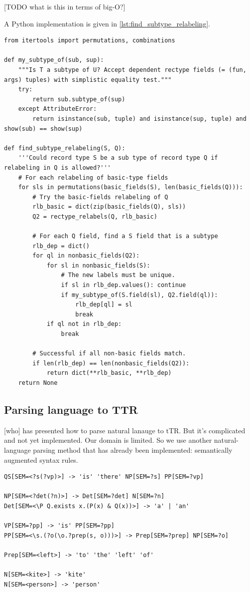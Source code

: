 [TODO what is this in terms of big-O?]

A Python implementation is given in \autoref{lst:find_subtype_relabeling}.

\begin{lstlisting}[label={lst:find_subtype_relabeling}, caption=The \texttt{find\_subtype\_relabeling} function]
from itertools import permutations, combinations

def my_subtype_of(sub, sup):
    """Is T a subtype of U? Accept dependent rectype fields (= (fun, args) tuples) with simplistic equality test."""
    try:
        return sub.subtype_of(sup)
    except AttributeError:
        return isinstance(sub, tuple) and isinstance(sup, tuple) and show(sub) == show(sup)

def find_subtype_relabeling(S, Q):
    '''Could record type S be a sub type of record type Q if relabeling in Q is allowed?'''
    # For each relabeling of basic-type fields
    for sls in permutations(basic_fields(S), len(basic_fields(Q))):
        # Try the basic-fields relabeling of Q
        rlb_basic = dict(zip(basic_fields(Q), sls))
        Q2 = rectype_relabels(Q, rlb_basic)
        
        # For each Q field, find a S field that is a subtype
        rlb_dep = dict()
        for ql in nonbasic_fields(Q2):
            for sl in nonbasic_fields(S):
                # The new labels must be unique.
                if sl in rlb_dep.values(): continue
                if my_subtype_of(S.field(sl), Q2.field(ql)):
                    rlb_dep[ql] = sl
                    break
            if ql not in rlb_dep:
                break

        # Successful if all non-basic fields match.
        if len(rlb_dep) == len(nonbasic_fields(Q2)):
            return dict(**rlb_basic, **rlb_dep)
    return None
\end{lstlisting}



\subsection{Parsing language to TTR}
\label{sec:parsing}

[who] has presented how to parse natural lanauge to tTR.
But it's complicated and not yet implemented.
Our domain is limited.
So we use another natural-language parsing method that has already been implemented: semantically augmented syntax rules.

\begin{lstlisting}[label={lst:grammar}, caption=A snippet of the FCFG grammar]
QS[SEM=<?s(?vp)>] -> 'is' 'there' NP[SEM=?s] PP[SEM=?vp]

NP[SEM=<?det(?n)>] -> Det[SEM=?det] N[SEM=?n]
Det[SEM=<\P Q.exists x.(P(x) & Q(x))>] -> 'a' | 'an'

VP[SEM=?pp] -> 'is' PP[SEM=?pp]
PP[SEM=<\s.(?o(\o.?prep(s, o)))>] -> Prep[SEM=?prep] NP[SEM=?o]

Prep[SEM=<left>] -> 'to' 'the' 'left' 'of'

N[SEM=<kite>] -> 'kite'
N[SEM=<person>] -> 'person'
\end{lstlisting}



